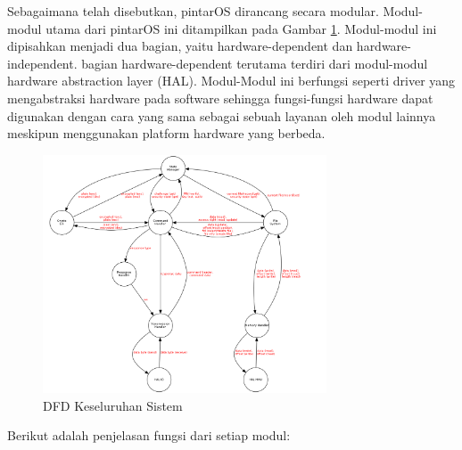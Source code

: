 Sebagaimana telah disebutkan, pintarOS dirancang secara modular. Modul-modul utama dari pintarOS ini ditampilkan pada Gambar \ref{fig-arch}. Modul-modul ini dipisahkan menjadi dua bagian, yaitu hardware-dependent dan hardware-independent. bagian hardware-dependent terutama terdiri dari modul-modul hardware abstraction layer (HAL). Modul-Modul ini berfungsi seperti driver yang mengabstraksi hardware pada software sehingga fungsi-fungsi hardware dapat digunakan dengan cara yang sama sebagai sebuah layanan oleh modul lainnya meskipun menggunakan platform hardware yang berbeda.

\begin{figure}[!h]
\centering
\includegraphics[width=0.75\textwidth]{image/overall/arch.png}
\caption{DFD Keseluruhan Sistem}
\label{fig-arch}
\end{figure}

Berikut adalah penjelasan fungsi dari setiap modul:

